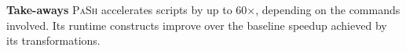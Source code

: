 \documentclass[sigplan, review, screen, anonymous]{acmart}
\newcommand{\eg}{{\em e.g.}, }
\newcommand{\ie}{{\em i.e.}, }
\newcommand{\heading}[1]{\vspace{4pt}\noindent\textbf{#1}\enspace}
\newcommand{\ttt}[1]{\texttt{#1}}
\newcommand{\cn}[1]{\mbox{\textcircled{\footnotesize #1}}}
\newcommand{\pur}{\cn{\textsc{P}}\xspace}
\newcommand{\kk}[1]{[{\color{magenta}kk: #1}]}
\newcommand{\sys}{{\scshape PaSh}\xspace}
\begin{document}
% 








\heading{Take-aways}
\sys accelerates scripts by up to 60$\times$, depending on the commands involved.
Its runtime constructs improve over the baseline speedup achieved by its transformations.
\end{document}
